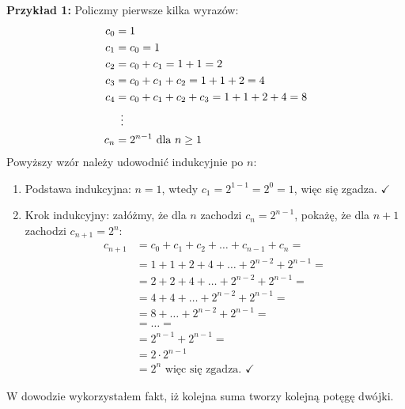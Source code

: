 \documentclass[a4paper,12pt]{article}
\begin{document}
\noindent \newline \textbf{Przykład 1:} Policzmy pierwsze kilka wyrazów:
\begin{align*}
	c_0 &= 1 \\
	c_1 &= c_0 = 1 \\
	c_2 &= c_0 + c_1 = 1 + 1 = 2	\\
	c_3 &= c_0 + c_1 + c_2 = 1 + 1 + 2 = 4 \\
	c_4 &= c_0 + c_1 + c_2 + c_3 = 1 + 1 + 2 + 4 = 8\\
		&\enskip \vdots \\
	c_n &= 2^{n-1} \text{ dla } n \geq 1 
\end{align*}
Powyższy wzór należy udowodnić indukcyjnie po $n$:
\begin{enumerate}
	\item Podstawa indukcyjna: $n = 1$, wtedy $c_1 = 2^{1-1} = 2^0 = 1$, więc się zgadza. $\checkmark$
	\item Krok indukcyjny: załóżmy, że dla $n$ zachodzi $c_n = 2^{n-1}$, pokażę, że dla $n+1$ zachodzi $c_{n+1} = 2^n$:
	\begin{align*}
		c_{n+1} &= c_0 + c_1 + c_2 + \ldots + c_{n-1} + c_n = \\ 
				&= 1 + 1 + 2 + 4 + \ldots + 2^{n-2} + 2^{n-1} = \\
				&= 2 + 2 + 4 + \ldots + 2^{n-2} + 2^{n-1} = \\
				&= 4 + 4 + \ldots + 2^{n-2} + 2^{n-1} = \\
				&= 8 + \ldots + 2^{n-2} + 2^{n-1} = \\
				&= \ldots = \\
				&= 2^{n-1} + 2^{n-1} = \\
				&= 2 \cdot 2^{n-1} \\
				&= 2^n \text{ więc się zgadza. } \checkmark
	\end{align*}
\end{enumerate}
W dowodzie wykorzystałem fakt, iż kolejna suma tworzy kolejną potęgę dwójki.
\end{document}
